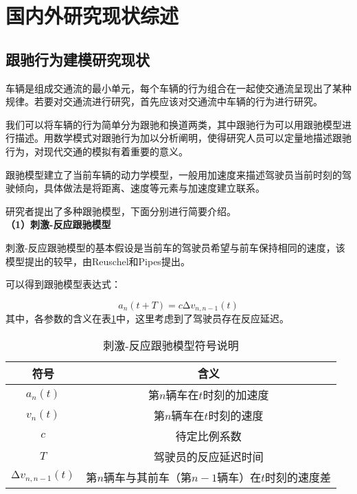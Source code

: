 \section{国内外研究现状综述}

\subsection{跟驰行为建模研究现状}

车辆是组成交通流的最小单元，每个车辆的行为组合在一起使交通流呈现出了某种规律。若要对交通流进行研究，首先应该对交通流中车辆的行为进行研究。

我们可以将车辆的行为简单分为跟驰和换道两类，其中跟驰行为可以用跟驰模型进行描述。用数学模式对跟驰行为加以分析阐明，使得研究人员可以定量地描述跟驰行为，对现代交通的模拟有着重要的意义。

跟驰模型建立了当前车辆的动力学模型，一般用加速度来描述驾驶员当前时刻的驾驶倾向，具体做法是将距离、速度等元素与加速度建立联系。

研究者提出了多种跟驰模型，下面分别进行简要介绍\cite{xiandai}。 \\

\noindent \textbf{（1）刺激-反应跟驰模型}

刺激-反应跟驰模型的基本假设是当前车的驾驶员希望与前车保持相同的速度，该模型提出的较早，由Reuschel\cite{reuschel1950vehicle}和Pipes\cite{Pipes}提出。

可以得到跟驰模型表达式：

\begin{equation}
  a_n(t+T) = c\increment{v_{n, n-1}}(t)
  \label{eq:chap01-1}
\end{equation}
其中，各参数的含义在表\ref{tab:chap01-1}中，这里考虑到了驾驶员存在反应延迟。

\begin{table}
  \centering
  \caption{刺激-反应跟驰模型符号说明}
  \begin{tabular}{cc}
    \toprule
    符号          &  含义                         \\
    \midrule
    $a_n(t)$   & 第$n$辆车在$t$时刻的加速度         \\
    $v_n(t)$   & 第$n$辆车在$t$时刻的速度         \\
    $c$        & 待定比例系数                    \\
    $T$        & 驾驶员的反应延迟时间 \\
    $\increment{v_{n, n-1}}(t)$  &  第$n$辆车与其前车（第$n-1$辆车）在$t$时刻的速度差   \\
    \bottomrule
  \end{tabular}
  \label{tab:chap01-1}
\end{table}

